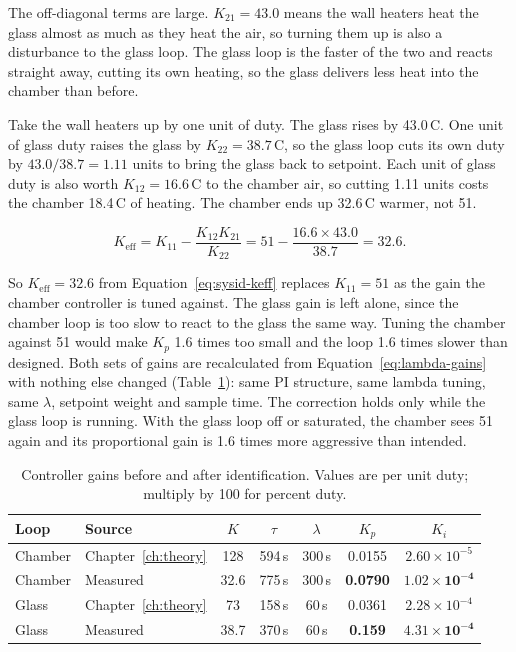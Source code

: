 The off-diagonal terms are large. $K_{21} = 43.0$ means the wall heaters heat the glass almost as much as they heat the air, so turning them up is also a disturbance to the glass loop. The glass loop is the faster of the two and reacts straight away, cutting its own heating, so the glass delivers less heat into the chamber than before.

Take the wall heaters up by one unit of duty. The glass rises by 43.0\,\textdegree{}C. One unit of glass duty raises the glass by $K_{22} = 38.7$\,\textdegree{}C, so the glass loop cuts its own duty by $43.0/38.7 = 1.11$ units to bring the glass back to setpoint. Each unit of glass duty is also worth $K_{12} = 16.6$\,\textdegree{}C to the chamber air, so cutting 1.11 units costs the chamber 18.4\,\textdegree{}C of heating. The chamber ends up 32.6\,\textdegree{}C warmer, not 51.

\begin{equation}
    K_\mathrm{eff} = K_{11} - \frac{K_{12}K_{21}}{K_{22}} = 51 - \frac{16.6 \times 43.0}{38.7} = 32.6.
    \label{eq:sysid-keff}
\end{equation}

So $K_\mathrm{eff} = 32.6$ from Equation~\ref{eq:sysid-keff} replaces $K_{11} = 51$ as the gain the chamber controller is tuned against. The glass gain is left alone, since the chamber loop is too slow to react to the glass the same way. Tuning the chamber against 51 would make $K_p$ 1.6 times too small and the loop 1.6 times slower than designed. Both sets of gains are recalculated from Equation~\ref{eq:lambda-gains} with nothing else changed (Table~\ref{tab:sysid-gains}): same PI structure, same lambda tuning, same $\lambda$, setpoint weight and sample time. The correction holds only while the glass loop is running. With the glass loop off or saturated, the chamber sees 51 again and its proportional gain is 1.6 times more aggressive than intended.

\begin{table}[htbp]
    \centering
    \caption{Controller gains before and after identification. Values are per unit duty; multiply by 100 for percent duty.}
    \label{tab:sysid-gains}
    \small
    \begin{tabular}{llccccc}
        \toprule
        \textbf{Loop} & \textbf{Source} & $K$ & $\tau$ & $\lambda$ & $K_p$ & $K_i$ \\
        \midrule
        Chamber & Chapter~\ref{ch:theory} & 128 & 594\,s & 300\,s & 0.0155 & $2.60\times10^{-5}$ \\
        Chamber & Measured & 32.6 & 775\,s & 300\,s & \textbf{0.0790} & $\mathbf{1.02\times10^{-4}}$ \\
        \midrule
        Glass & Chapter~\ref{ch:theory} & 73 & 158\,s & 60\,s & 0.0361 & $2.28\times10^{-4}$ \\
        Glass & Measured & 38.7 & 370\,s & 60\,s & \textbf{0.159} & $\mathbf{4.31\times10^{-4}}$ \\
        \bottomrule
    \end{tabular}
\end{table}

